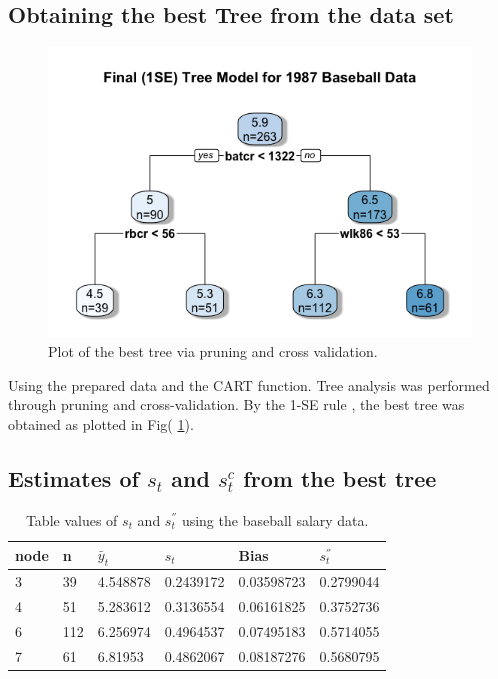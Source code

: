 \subsection{Obtaining the best Tree from the data set}
\begin{figure}[H]
	\centering
	\includegraphics[scale=0.60, angle=0]{RealD_Tree.png}
	\caption{Plot of the best tree via pruning and cross validation. 
		\label{RealTree}}
\end{figure}
Using the prepared data and the CART function. Tree analysis was performed through pruning and cross-validation. By the 1-SE rule \citep{breiman1984classification},  the best tree was obtained as plotted in Fig( \ref{RealTree}).


\subsection{Estimates of  $s_t $ and $s_t^{c} $ from the best tree}
\vspace{0.1in}
\begin{table}[H]
	\caption{Table values of $s_t$ and  $s^{''}_t$ using the baseball salary data.}
	\vspace{0.1in}
	\centering
	\begin{tabular}{|p{1cm}|p{1cm}|p{2cm}| p{2cm}|p{2cm}|p{2cm}|}
		\hline
		node  &n &$\bar{y}_{t}$ &$s_t$  &Bias & $s^{''}_t$\\
		\hline
		3&	39&	4.548878&	0.2439172&	0.03598723&	0.2799044
\\
		4&	51&	5.283612&	0.3136554&	0.06161825&	0.3752736
\\
		6&	112&	6.256974&	0.4964537&	0.07495183&	0.5714055\\

		7&	61&	6.81953&	0.4862067&	0.08187276&	0.5680795\\
		\hline
	\end{tabular}
	\label{table:Baseball}
\end{table}


